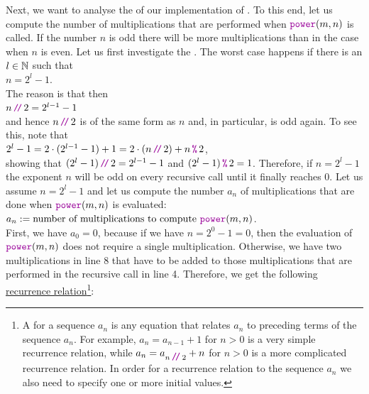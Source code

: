 Next, we want to analyse the  of our implementation of .
To this end, let us compute the number of multiplications that are performed when
$\mytt{power}(m,n)$ is called.  If the number $n$ is odd there will be more multiplications than
in the case when $n$ is even.  Let us first investigate the .  
The worst case happens if there is an $l\in {\mathbb N}$ such that 
\\[0.2cm]
\hspace*{1.3cm}
$n = 2^l - 1$. 
\\[0.2cm]
The reason is that then
\\[0.2cm]
\hspace*{1.3cm} $n \dv 2 = 2^{l-1} - 1$
\\[0.2cm]
and hence $n \dv 2$ is of the same form as $n$ and, in particular, is odd again.  To see this, note that
\\[0.2cm]
\hspace*{1.3cm}
$2^l - 1 = 2 \cdot (2^{l-1} - 1) + 1 = 2 \cdot(n \dv 2) + n \,\mytt{\symbol{37}}\, 2$,
\\[0.2cm]
showing that $(2^l -1 ) \dv 2 = 2^{l-1} -1$ and $(2^l -1 )\,\mytt{\symbol{37}}\, 2 = 1$.
Therefore, if $n = 2^l - 1$ the exponent $n$ will be odd on every recursive call until it finally reaches $0$.
Let us assume $n = 2^l - 1$ and let us compute the number $a_n$ of multiplications that
are done when $\mytt{power}(m,n)$ is evaluated:
\\[0.2cm]
\hspace*{1.3cm}
$a_n := \mbox{number of multiplications to compute } \mytt{power}(m, n)$.
\\[0.2cm]
First, we have $a_0 = 0$, because if we have $n = 2^0 - 1 = 0$, then the evaluation of 
$\mytt{power}(m, n)$ does not require a single multiplication.
Otherwise, we have two multiplications in line 8 that have to be added to those multiplications
that are performed in the recursive call in line 4.  Therefore, we get the following
\href{http://en.wikipedia.org/wiki/Recurrence_relation}{recurrence relation}\footnote{
  A   for a sequence $a_n$ is any equation that relates
  $a_n$ to preceding terms of the sequence $a_n$.  For example, $a_n = a_{n-1} + 1$ for $n > 0$ is a very
  simple recurrence relation, while $a_n = a_{n \dv 2} + n$ for $n > 0$ is a more complicated recurrence
  relation.  In order for a recurrence relation to  the sequence $a_n$ we also need to specify one
  or more initial values.  
}:
\\[0.2cm]

